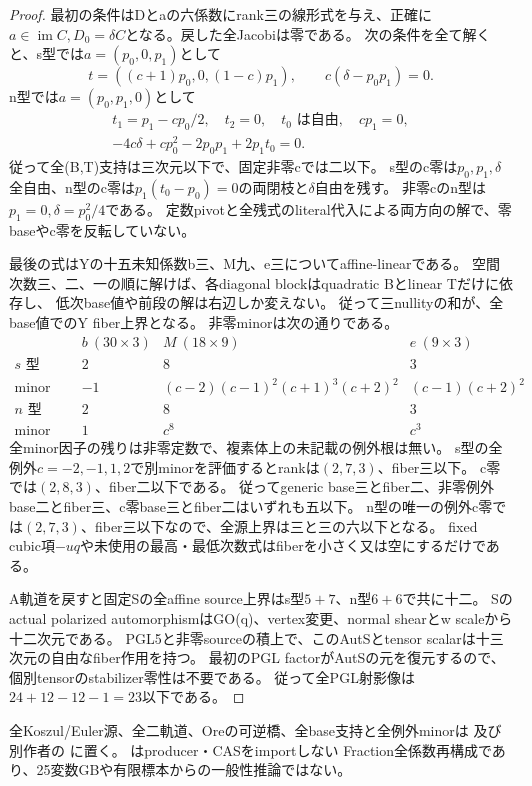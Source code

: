 \documentclass[a4paper,11pt]{ltjsarticle}
\theoremstyle{definition}
\begin{document}
\begin{proof}
最初の条件はDとaの六係数にrank三の線形式を与え、正確に
$a\in\operatorname{im}C,D_0=\delta C$となる。戻した全Jacobiは零である。
次の条件を全て解くと、s型では$a=(p_0,0,p_1)$として
\[
 t=((c+1)p_0,0,(1-c)p_1),\qquad c(\delta-p_0p_1)=0.
\]
n型では$a=(p_0,p_1,0)$として
\[
\begin{gathered}
 t_1=p_1-cp_0/2,\quad t_2=0,\quad t_0\text{ は自由},\quad cp_1=0,\\
 -4c\delta+cp_0^2-2p_0p_1+2p_1t_0=0.
\end{gathered}
\]
従って全(B,T)支持は三次元以下で、固定非零cでは二以下。
s型のc零は$p_0,p_1,\delta$全自由、n型のc零は$p_1(t_0-p_0)=0$の両閉枝と$\delta$自由を残す。
非零cのn型は$p_1=0,\delta=p_0^2/4$である。
定数pivotと全残式のliteral代入による両方向の解で、零baseやc零を反転していない。

最後の式はYの十五未知係数b三、M九、e三についてaffine-linearである。
空間次数三、二、一の順に解けば、各diagonal blockはquadratic Bとlinear Tだけに依存し、
低次base値や前段の解は右辺しか変えない。
従って三nullityの和が、全base値でのY fiber上界となる。
非零minorは次の通りである。
\[
\begin{array}{c|c|c|c}
 &b\ (30\times3)&M\ (18\times9)&e\ (9\times3)\\ \hline
 s\text{ 型 generic rank}&2&8&3\\
 \text{minor}&-1&(c-2)(c-1)^2(c+1)^3(c+2)^2&(c-1)(c+2)^2\\
 n\text{ 型 generic rank}&2&8&3\\
 \text{minor}&1&c^8&c^3
\end{array}
\]
全minor因子の残りは非零定数で、複素体上の未記載の例外根は無い。
s型の全例外$c=-2,-1,1,2$で別minorを評価するとrankは$(2,7,3)$、fiber三以下。
c零では$(2,8,3)$、fiber二以下である。
従ってgeneric base三とfiber二、非零例外base二とfiber三、c零base三とfiber二はいずれも五以下。
n型の唯一の例外c零では$(2,7,3)$、fiber三以下なので、全源上界は三と三の六以下となる。
fixed cubic項$-uq$や未使用の最高・最低次数式はfiberを小さく又は空にするだけである。

A軌道を戻すと固定Sの全affine source上界はs型$5+7$、n型$6+6$で共に十二。
Sのactual polarized automorphismはGO(q)、vertex変更、normal shearとw scaleから十二次元である。
PGL5と非零sourceの積上で、このAutSとtensor scalarは十三次元の自由なfiber作用を持つ。
最初のPGL factorがAutSの元を復元するので、個別tensorのstabilizer零性は不要である。
従って全PGL射影像は$24+12-12-1=23$以下である。
\end{proof}
全Koszul/Euler源、全二軌道、Oreの可逆橋、全base支持と全例外minorは
及び別作者の
に置く。
はproducer・CASをimportしない
Fraction全係数再構成であり、25変数GBや有限標本からの一般性推論ではない。
\end{document}

